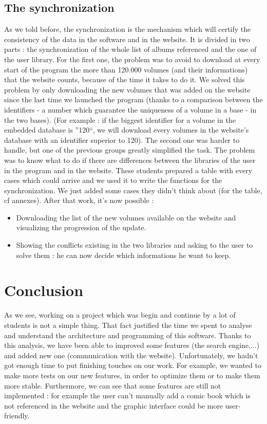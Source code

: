 \documentclass[11pt]{report} %
\begin{document}
\section{The synchronization}
As we told before, the synchronization is the mechanism which will certify the consistency of the data in the software and in the website. It is divided in two parts : the synchronization of the whole list of albums referenced and the one of the user library.
\newline For the first one, the problem was to avoid to download at every start of the program the more than 120.000 volumes (and their informations) that the website counts, because of the time it takes to do it. We solved this problem by only downloading the new volumes that was added on the website since the last time we launched the program (thanks to a comparison between the identifiers - a number which guarantee the uniqueness of a volume in a base - in the two bases).
\newline(For example : if the biggest identifier for a volume in the embedded database is ''120``, we will download every volumes in the website's database with an identifier superior to 120).
\newline The second one was harder to handle, but one of the previous groups greatly simplified the task. The problem was to know what to do if there are differences between the libraries of the user in the program and in the website. These students prepared a table with every cases which could arrive and we used it to write the functions for the synchronization. We just added some cases they didn't think about (for the table, cf annexes).
\newline After that work, it's now possible :
\begin{itemize}
\item Downloading the list of the new volumes available on the website and visualizing the progression of the update.
\item Showing the conflicts existing in the two libraries and asking to the user to solve them : he can now decide which informations he want to keep.
\end{itemize}


\chapter{Conclusion}
As we see, working on a project which was begin and continue by a lot of students is not a simple thing. That fact justified the time we spent to analyse and understand the architecture and programming of this software. Thanks to this analysis, we have been able to improved some features (the search engine,...) and added new one (communication with the website). 
\newline Unfortunately, we hadn't got enough time to put finishing touches on our work. For example, we wanted to make more tests on our new features, in order to optimize them or to make them more stable.
\newline Furthermore, we can see that some features are still not implemented : for example the user can't manually add a comic book which is not referenced in the website and the graphic interface could be more user-friendly.


\end{document}
